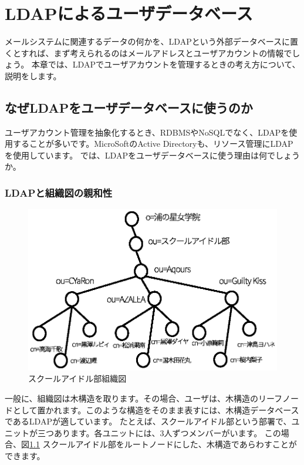 \chapter{LDAPによるユーザデータベース}

メールシステムに関連するデータの何かを、LDAPという外部データベースに置くとすれば、まず考えられるのはメールアドレスとユーザアカウントの情報でしょう。
本章では、LDAPでユーザアカウントを管理するときの考え方について、説明をします。

\section{なぜLDAPをユーザデータベースに使うのか}

ユーザアカウント管理を抽象化するとき、RDBMSやNoSQLでなく、LDAPを使用することが多いです。MicroSoftのActive Directoryも、リソース管理にLDAPを使用しています。
では、LDAPをユーザデータベースに使う理由は何でしょうか。

\subsection{LDAPと組織図の親和性}

\begin{figure}[htbp]
	\includegraphics[width=12cm,clip]{draw/unitmap.eps}
	\caption{スクールアイドル部組織図}
	\label{fig:unitmap}
\end{figure}

一般に、組織図は木構造を取ります。その場合、ユーザは、木構造のリーフノードとして置かれます。このような構造をそのまま表すには、木構造データベースであるLDAPが適しています。
たとえば、スクールアイドル部という部署で、ユニットが三つあります。各ユニットには、3人ずつメンバーがいます。
この場合、図\ref{fig:unitmap} スクールアイドル部をルートノードにした、木構造であらわすことができます。


